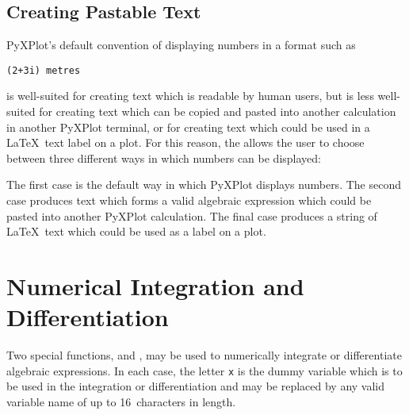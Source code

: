 \subsection{Creating Pastable Text}
\label{sec:pastable}

PyXPlot's default convention of displaying numbers in a format such as

\begin{verbatim}
(2+3i) metres
\end{verbatim}

\noindent is well-suited for creating text which is readable by human users, but
is less well-suited for creating text which can be copied and pasted into
another calculation in another PyXPlot terminal, or for creating text which
could be used in a \LaTeX\ text label on a plot. For this reason, the
 allows the user to choose between three
different ways in which numbers can be displayed:

\vspace{3mm}
\newline
{}\newline
{}\newline
{}\newline
{}\newline
{}\newline
{}\newline
{}\newline
{}
\vspace{3mm}

The first case is the default way in which PyXPlot displays numbers. The second
case produces text which forms a valid algebraic expression which could be
pasted into another PyXPlot calculation. The final case produces a string of
\LaTeX\ text which could be used as a label on a plot.

\section{Numerical Integration and Differentiation}

 Two special functions,
 and , may be used to numerically
integrate or differentiate algebraic expressions.  In each case, the letter
{\tt x} is the dummy variable which is to be used in the integration or
differentiation and may be replaced by any valid variable name of up to
16~characters in length.


